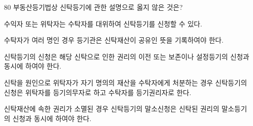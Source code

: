 \begin{question}{80}
부동산등기법상 신탁등기에 관한 설명으로 옳지 않은 것은?
\begin{choices}
  \item 수익자 또는 위탁자는 수탁자를 대위하여 신탁등기를 신청할 수 있다.
  \item 수탁자가 여러 명인 경우 등기관은 신탁재산이 공유인 뜻을 기록하여야 한다.
  \item 신탁등기의 신청은 해당 신탁으로 인한 권리의 이전 또는 보존이나 설정등기의 신청과 동시에 하여야 한다.
  \item 신탁을 원인으로 위탁자가 자기 명의의 재산을 수탁자에게 처분하는 경우 신탁등기의 신청은 위탁자를 등기의무자로 하고 수탁자를 등기권리자로 한다.
  \item 신탁재산에 속한 권리가 소멸된 경우 신탁등기의 말소신청은 신탁된 권리의 말소등기의 신청과 동시에 하여야 한다.
\end{choices}
\end{question}
